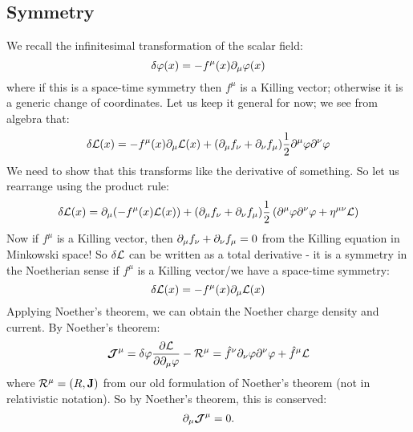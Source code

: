 \subsection{Symmetry}
We recall the infinitesimal transformation of the scalar field:
\begin{equation}
    \delta \varphi(x) = -f^\mu(x)\p_\mu \varphi(x)
\end{equation}
where if this is a space-time symmetry then $f^\mu$ is a Killing vector; otherwise it is a generic change of coordinates. Let us keep it general for now; we see from algebra that:
\begin{equation}
    \delta \L(x) = -f^\mu(x)\p_\mu \L(x) + (\p_\mu f_\nu + \p_\nu f_\mu)\frac{1}{2}\p^\mu \varphi \p^\nu \varphi
\end{equation}
We need to show that this transforms like the derivative of something. So let us rearrange using the product rule:
\begin{equation} 
    \delta \L(x) = \p_\mu (-f^\mu(x)\L(x)) + (\p_\mu f_\nu + \p_\nu f_\mu)\frac{1}{2}\left(\p^\mu \varphi \p^\nu \varphi + \eta^{\mu\nu}\L\right)
\end{equation}
Now if $f^\mu$ is a Killing vector, then $\partial_\mu f_\nu + \partial_\nu f_\mu = 0$ from the Killing equation in Minkowski space! So $\delta \mathcal{L}$ can be written as a total derivative - it is a symmetry in the Noetherian sense if $f^\mu$ is a Killing vector/we have a space-time symmetry:
\begin{equation}
    \delta \mathcal{L}(x) = -f^\mu(x) \partial_\mu \mathcal{L}(x)
\end{equation}
Applying Noether's theorem, we can obtain the Noether charge density and current. By Noether's theorem:
\begin{equation}
    \gv{\mathcal{J}}^\mu = \delta\varphi \dpd{\L}{\p_\mu\varphi} - \mathcal{R}^\mu = \hat{f}^\nu \p_\nu \varphi \p^\nu \varphi + \hat{f}^\mu\L
\end{equation}
where $\mathcal{R}^\mu = (R, \mathbf{J})$ from our old formulation of Noether's theorem (not in relativistic notation). So by Noether's theorem, this is conserved:
\begin{equation}
    \partial_\mu \mbox{\boldmath$ \mathcal{J} $}^\mu = 0.
\end{equation}

